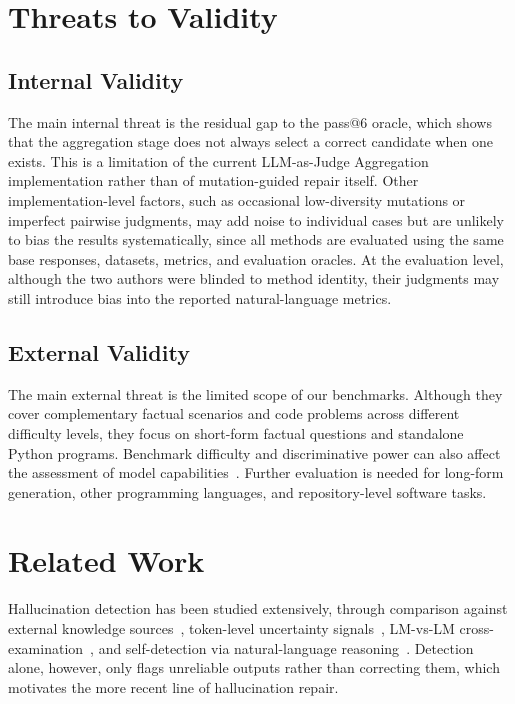 \documentclass[acmsmall,screen,review,anonymous]{acmart}
\begin{document}
\section{Threats to Validity}

\subsection{Internal Validity}
The main internal threat is the residual gap to the pass@6 oracle, which shows that the aggregation stage does not always select a correct candidate when one exists. This is a limitation of the current LLM-as-Judge Aggregation implementation rather than of mutation-guided repair itself. Other implementation-level factors, such as occasional low-diversity mutations or imperfect pairwise judgments, may add noise to individual cases but are unlikely to bias the results systematically, since all methods are evaluated using the same base responses, datasets, metrics, and evaluation oracles. At the evaluation level, although the two authors were blinded to method identity, their judgments may still introduce bias into the reported natural-language metrics.

\subsection{External Validity}
The main external threat is the limited scope of our benchmarks. Although they cover complementary factual scenarios and code problems across different difficulty levels, they focus on short-form factual questions and standalone Python programs. Benchmark difficulty and discriminative power can also affect the assessment of model capabilities~\cite{zhou2025lost}. Further evaluation is needed for long-form generation, other programming languages, and repository-level software tasks.


\section{Related Work}

Hallucination detection has been studied extensively, through comparison against external knowledge sources~\cite{guo2022survey, galitsky2025truth}, token-level uncertainty signals~\cite{varshney2023stitch,vazhentsev2025token}, LM-vs-LM cross-examination~\cite{cohen2023lm}, and self-detection via natural-language reasoning~\cite{zhao2024knowing}. Detection alone, however, only flags unreliable outputs rather than correcting them, which motivates the more recent line of hallucination repair.
\end{document}
